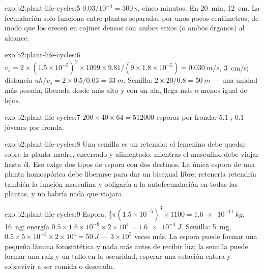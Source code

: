 \begin{solution}{exo:b2:plant-life-cycles:5}
$0.03/10^{-4} = \qty{300}{s}$, cinco minutos. En \qty{20}{min},
\qty{12}{cm}. La fecundación solo funciona entre plantas separadas por
unos pocos centímetros, de modo que los  crecen en cojines densos
con ambos sexos (o ambos órganos) al alcance.
\end{solution}

\begin{solution}{exo:b2:plant-life-cycles:6}
$v_s = 2\times(1.5\times 10^{-5})^2\times 1099\times 9.81/(9\times
1.8\times 10^{-5}) = \qty{0.030}{m/s}$, \qty{3}{cm/s}; distancia $uh/v_s
= 2\times 0.5/0.03 = \qty{33}{m}$. Semilla: $2\times 20/0.8 =
\qty{50}{m}$ --- una unidad más pesada, liberada desde más alto y con
un ala, llega más o menos igual de lejos.
\end{solution}

\begin{solution}{exo:b2:plant-life-cycles:7}
$200\times 40\times 64 = \num{512000}$ esporas por fronda; $5.1$
; $0.1$  jóvenes por fronda.
\end{solution}

\begin{solution}{exo:b2:plant-life-cycles:8}
Una semilla es un  retenido: el  femenino debe quedar
sobre la planta madre, encerrado y alimentado, mientras el 
masculino debe viajar hasta él. Eso exige dos tipos de espora con dos
destinos. La única espora de una planta homospórica debe liberarse para
dar un  bisexual libre; retenerla retendría también la función
masculina y obligaría a la autofecundación en todas las plantas, y no
habría nada que viajara.
\end{solution}

\begin{solution}{exo:b2:plant-life-cycles:9}
Espora: $\tfrac43\pi(1.5\times 10^{-5})^3\times 1100 =
\qty{1.6e-11}{kg}$, \qty{16}{ng}; energía $0.5\times 1.6\times
10^{-8}\times 2\times 10^{4} = \qty{1.6e-4}{J}$. Semilla: \qty{5}{mg},
$0.5\times 5\times 10^{-3}\times 2\times 10^{4} = \qty{50}{J}$ ---
$3\times 10^{5}$ veces más. La espora puede formar una pequeña lámina
fotosintética y nada más antes de recibir luz; la semilla puede formar
una raíz y un tallo en la oscuridad, esperar una estación entera y
sobrevivir a ser comida o desecada.
\end{solution}


